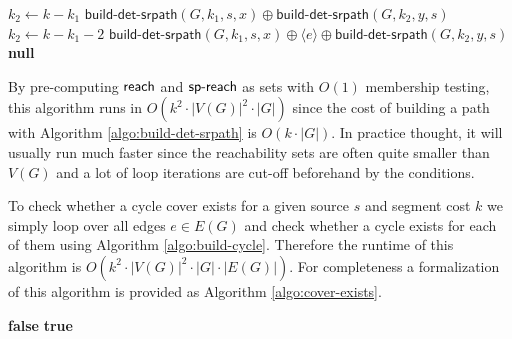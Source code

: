 \begin{algorithm}[t]
\small
\caption{$\textsf{build-srcycle}\left( G, s, k, e \right)$}
\begin{algorithmic}[1]
{}
 \label{line:case1-cycle}
  \STATE $k_2 \gets k - k_1$
	\RETURN $\textsf{build-det-srpath}(G, k_1, s, x) \oplus \textsf{build-det-srpath}(G, k_2, y, s)$
      \ENDIF
    \ENDFOR
  \ENDFOR
\ENDFOR \label{line:case1-cycle-end}
  \label{line:case2-cycle}
  \STATE $k_2 \gets k - k_1 - 2$
	  \RETURN $\textsf{build-det-srpath}(G, k_1, s, x) \oplus \langle e \rangle \oplus \textsf{build-det-srpath}(G, k_2, y, s)$
	\ENDIF
      \ENDFOR
    \ENDIF
  \ENDFOR
\ENDFOR  \label{line:case2-cycle-end}
\RETURN \textbf{null}
\end{algorithmic}
\label{algo:build-cycle}
\end{algorithm}

By pre-computing $\textsf{reach}$ and $\textsf{sp-reach}$ as sets with $O(1)$ membership testing, this algorithm runs in $O(k^2 \cdot |V(G)|^2 \cdot |G|)$ since the cost 
of building a path with Algorithm \ref{algo:build-det-srpath} is $O(k \cdot |G|)$. In practice thought, it will usually run much faster since the reachability sets are often quite smaller than $V(G)$ and a lot of loop iterations are cut-off beforehand by the conditions.

To check whether a cycle cover exists for a given source $s$ and segment cost $k$ we simply loop over all edges $e \in E(G)$ and check whether a cycle exists
for each of them using Algorithm \ref{algo:build-cycle}. Therefore the runtime of this algorithm is $O(k^2 \cdot |V(G)|^2 \cdot |G| \cdot |E(G)|)$. For 
completeness a formalization of this algorithm is provided as Algorithm \ref{algo:cover-exists}.

\begin{algorithm}[t]
\small
\caption{$\textsf{cover-exists}\left( G, s, k \right)$}
\begin{algorithmic}[1]
{}
    \RETURN \textbf{false}
  \ENDIF
\ENDFOR
\RETURN \textbf{true}
\end{algorithmic}
\label{algo:cover-exists}
\end{algorithm}

